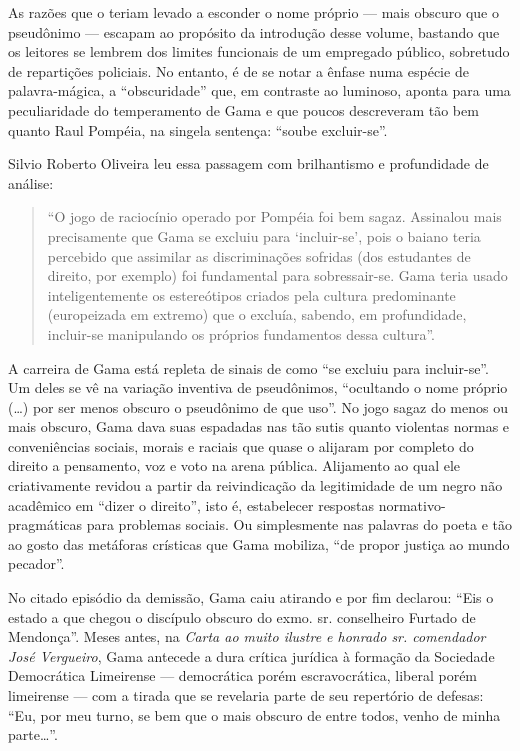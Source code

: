 As razões que o teriam levado a esconder o nome próprio --- mais obscuro
que o pseudônimo --- escapam ao propósito da introdução desse volume,
bastando que os leitores se lembrem dos limites funcionais de um
empregado público, sobretudo de repartições policiais. No entanto, é de
se notar a ênfase numa espécie de palavra-mágica, a ``obscuridade'' que,
em contraste ao luminoso, aponta para uma peculiaridade do temperamento
de Gama e que poucos descreveram tão bem quanto Raul Pompéia, na singela
sentença: ``soube excluir-se''.

Silvio Roberto Oliveira leu essa passagem com brilhantismo e
profundidade de análise:

\begin{quote}
``O jogo de raciocínio operado por Pompéia foi bem sagaz. Assinalou mais
precisamente que Gama se excluiu para `incluir-se', pois o baiano teria
percebido que assimilar as discriminações sofridas (dos estudantes de
direito, por exemplo) foi fundamental para sobressair-se. Gama teria
usado inteligentemente os estereótipos criados pela cultura predominante
(europeizada em extremo) que o excluía, sabendo, em profundidade,
incluir-se manipulando os próprios fundamentos dessa cultura''.
\end{quote}

A carreira de Gama está repleta de sinais de como ``se excluiu para
incluir-se''. Um deles se vê na variação inventiva de pseudônimos,
``ocultando o nome próprio (\ldots{}) por ser menos obscuro o pseudônimo de
que uso''. No jogo sagaz do menos ou mais obscuro, Gama dava suas
espadadas nas tão sutis quanto violentas normas e conveniências sociais,
morais e raciais que quase o alijaram por completo do direito a
pensamento, voz e voto na arena pública. Alijamento ao qual ele
criativamente revidou a partir da reivindicação da legitimidade de um
negro não acadêmico em ``dizer o direito'', isto é, estabelecer respostas
normativo-pragmáticas para problemas sociais. Ou simplesmente nas
palavras do poeta e tão ao gosto das metáforas crísticas que Gama
mobiliza, ``de propor justiça ao mundo pecador''.

No citado episódio da demissão, Gama caiu atirando e por fim declarou:
``Eis o estado a que chegou o discípulo obscuro do exmo. sr. conselheiro
Furtado de Mendonça''. Meses antes, na \emph{Carta ao muito ilustre e
honrado sr. comendador José Vergueiro}, Gama antecede a dura crítica
jurídica à formação da Sociedade Democrática Limeirense --- democrática
porém escravocrática, liberal porém limeirense --- com a tirada que se
revelaria parte de seu repertório de defesas: ``Eu, por meu turno, se bem
que o mais obscuro de entre todos, venho de minha parte\ldots{}''.

